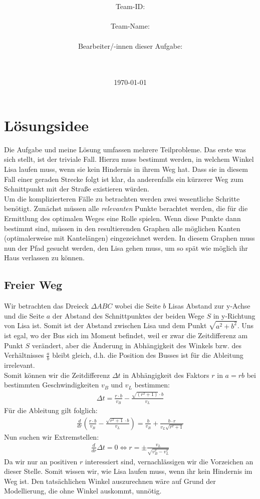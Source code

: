 \documentclass[a4paper,10pt,ngerman]{scrartcl}
\title{\textbf{\Huge\Aufgabe}}
\author{\LARGE Team-ID: \LARGE \TeamID \\\\
	    \LARGE Team-Name: \LARGE \TeamName \\\\
	    \LARGE Bearbeiter/-innen dieser Aufgabe: \\ 
	    \LARGE \Namen\\\\}
\date{\LARGE\today}
\begin{document}
\maketitle
\tableofcontents

\vspace{0.5cm}

\section{Lösungsidee}
Die Aufgabe und meine Lösung umfassen mehrere Teilprobleme. Das erste was sich stellt, ist der triviale Fall. Hierzu muss bestimmt werden, in welchem Winkel Lisa laufen muss, wenn sie kein Hindernis in ihrem Weg hat. Dass sie in diesem Fall einer geraden Strecke folgt ist klar, da anderenfalls ein kürzerer Weg zum Schnittpunkt mit der Stra\ss e existieren würden.\\
\indent Um die komplizierteren Fälle zu betrachten werden zwei wesentliche Schritte benötigt. Zunächst müssen alle \emph{relevanten} Punkte berachtet werden, die für die Ermittlung des optimalen Weges eine Rolle spielen. Wenn diese Punkte dann bestimmt sind, müssen in den resultierenden Graphen alle möglichen Kanten (optimalerweise mit Kantelängen) eingezeichnet werden. In diesem Graphen muss nun der Pfad gesucht werden, den Lisa gehen muss, um so spät wie möglich ihr Haus verlassen zu können.
\subsection{Freier Weg}
Wir betrachten das Dreieck $\Delta ABC$ wobei die Seite $b$ Lisas Abstand zur y-Achse und die Seite $a$ der Abstand des Schnittpunktes der beiden Wege $S$ in y-Richtung von Lisa ist. Somit ist der Abstand zwischen Lisa und dem Punkt $\sqrt{a^2 + b^2}$. Uns ist egal, wo der Bus sich im Moment befindet, weil er zwar die Zeitdifferenz am Punkt $S$ verändert, aber die Änderung in Abhängigkeit des Winkels bzw. des Verhältnisses $\frac{a}{b}$ bleibt gleich, d.h. die Position des Busses ist für die Ableitung irrelevant.\\
Somit können wir die Zeitdifferenz $\Delta t$ in Abhängigkeit des Faktors $r$ in $a=rb$ bei bestimmten Geschwindigkeiten $v_B$ und $v_L$ bestimmen:
\begin{align}
\Delta t = \frac{r\cdot b}{v_B} - \frac{\sqrt{(r^2+1)}\cdot b }{v_L}
\end{align}
Für die Ableitung gilt folglich:
\begin{align}
\frac{d}{dr}\left(\frac{r\cdot b}{v_B} - \frac{\sqrt{r^2+1}\cdot b }{v_L}\right)= \frac{b}{v_B} + \frac{b\cdot r }{v_L\sqrt{r^2+1}}
\end{align}
Nun suchen wir Extremstellen:
\begin{align}
\frac{d}{dr}\Delta t = 0 \Leftrightarrow r = \pm\frac{v_L}{\sqrt{v_B^2 - v_L^2}}
\end{align}
Da wir nur an positiven $r$ interessiert sind, vernachlässigen wir die Vorzeichen an dieser Stelle. Somit wissen wir, wie Lisa laufen muss, wenn ihr kein Hindernis im Weg ist. Den tatsächlichen Winkel auszurechnen wäre auf Grund der Modellierung, die ohne Winkel auskommt, unnötig.
\end{document}
